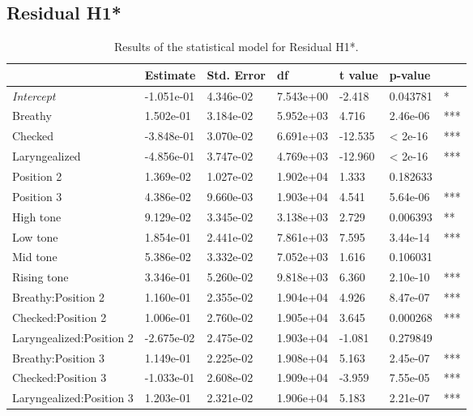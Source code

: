 \documentclass[12pt, letterpaper]{article}
\providecommand{\lsptoprule}{\midrule\toprule}
\providecommand{\lspbottomrule}{\bottomrule\midrule}
\begin{document}
\subsection{Residual H1*} \label{sec:ResidH1}

\begin{table}[!h]
  \centering
  \caption{Results of the statistical model for Residual H1*.}
  \label{tab:H1H2Results}
  \begin{tabular}{lllllll}
    \lsptoprule
     & Estimate & Std. Error & df & t value & p-value & \\ \hline
    \textit{Intercept} & -1.051e-01 & 4.346e-02 & 7.543e+00 & -2.418 & 0.043781 & * \\
    Breathy & 1.502e-01 & 3.184e-02 & 5.952e+03 & 4.716 & 2.46e-06 & *** \\
    Checked & -3.848e-01 & 3.070e-02 & 6.691e+03 & -12.535 & < 2e-16 & *** \\
    Laryngealized & -4.856e-01 & 3.747e-02 & 4.769e+03 & -12.960 & < 2e-16 & *** \\
    Position 2 & 1.369e-02 & 1.027e-02 & 1.902e+04 & 1.333 & 0.182633 & \\
    Position 3 & 4.386e-02 & 9.660e-03 & 1.903e+04 & 4.541 & 5.64e-06 & *** \\
    High tone & 9.129e-02 & 3.345e-02 & 3.138e+03 & 2.729 & 0.006393 & ** \\
    Low tone & 1.854e-01 & 2.441e-02 & 7.861e+03 & 7.595 & 3.44e-14 & *** \\
    Mid tone & 5.386e-02 & 3.332e-02 & 7.052e+03 & 1.616 & 0.106031 & \\
    Rising tone & 3.346e-01 & 5.260e-02 & 9.818e+03 & 6.360 & 2.10e-10 & *** \\
    Breathy:Position 2 & 1.160e-01 & 2.355e-02 & 1.904e+04 & 4.926 & 8.47e-07 & *** \\
    Checked:Position 2 & 1.006e-01 & 2.760e-02 & 1.905e+04 & 3.645 & 0.000268 & *** \\
    Laryngealized:Position 2 & -2.675e-02 & 2.475e-02 & 1.903e+04 & -1.081 & 0.279849 & \\
    Breathy:Position 3 & 1.149e-01 & 2.225e-02 & 1.908e+04 & 5.163 & 2.45e-07 & *** \\
    Checked:Position 3 & -1.033e-01 & 2.608e-02 & 1.909e+04 & -3.959 & 7.55e-05 & *** \\
    Laryngealized:Position 3 & 1.203e-01 & 2.321e-02 & 1.906e+04 & 5.183 & 2.21e-07 & ***\\
    \lspbottomrule
  \end{tabular}
\end{table}
\end{document}
